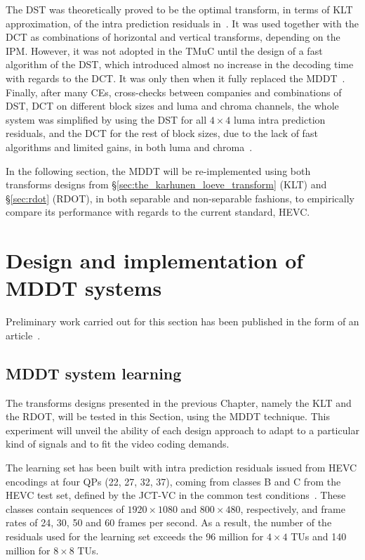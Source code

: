 \documentclass[11pt,a4paper,openright,twoside]{book}
\numberwithin{equation}{section} %
\numberwithin{figure}{section} %
\numberwithin{table}{section} %
\begin{document}
The \ac{DST} was theoretically proved to be the optimal transform, in
terms of \ac{KLT} approximation, of the intra prediction residuals
in~\cite{JCTVC-C108, JCTVC-D033}.
It was used together with the \ac{DCT} as combinations of horizontal and
vertical transforms, depending on the \ac{IPM}.
However, it was not adopted in the \ac{TMuC} until the design of a fast
algorithm of the \ac{DST}, which introduced almost no increase in the
decoding time with regards to the \ac{DCT}.
It was only then when it fully replaced the \ac{MDDT}~\cite{JCTVC-D048,
JCTVC-E125, JCTVC-F283, JCTVC-G108}.
Finally, after many \acp{CE}, cross-checks between companies and
combinations of \ac{DST}, \ac{DCT} on different block sizes and luma and
chroma channels, the whole system was simplified by using the \ac{DST}
for all $4\times4$ luma intra prediction residuals, and the \ac{DCT} for
the rest of block sizes, due to the lack of fast algorithms and limited
gains, in both luma and chroma~\cite{JCTVC-J0021}.

In the following section, the \ac{MDDT} will be re-implemented using both
transforms designs from \S\ref{sec:the_karhunen_loeve_transform} (\ac{KLT})
and \S\ref{sec:rdot} (\ac{RDOT}), in both
separable and non-separable fashions, to empirically compare its performance
with regards to the current standard, \ac{HEVC}.

\section{Design and implementation of \acs{MDDT} systems}
\label{sec:mddt_design_and_implementation}

Preliminary work carried out for this section has been published in the form
of an article~\cite{arrufat-14-mddt-rdot}.

\subsection{\acs{MDDT} system learning}
\label{sub:mddt_system_learning}

The transforms designs presented in the previous Chapter, namely the \ac{KLT}
and the \ac{RDOT}, will be tested in this Section, using the \ac{MDDT}
technique.
This experiment will unveil the ability of each design approach to adapt to a
particular kind of signals and to fit the video coding demands.

The learning set has been built with intra prediction residuals issued from
\ac{HEVC} encodings at four \acp{QP} (22, 27, 32, 37), coming from classes B
and C from the \ac{HEVC} test set, defined by the \ac{JCT-VC} in the common
test conditions~\cite{bossen-12-common-test-conditions}.
These classes contain sequences of $1920\times1080$ and $800\times480$,
respectively, and frame rates of 24, 30, 50 and 60 frames per second.
As a result, the number of the residuals used for the learning set exceeds the
96 million for $4\times4$ \acp{TU} and 140 million for $8\times8$ \acp{TU}.
\end{document}
